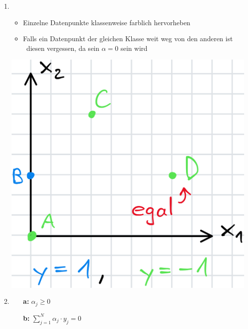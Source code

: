 \begin{enumerate}
    \item {} \\
    \begin{minipage}[c]{0.6\columnwidth}
        \begin{itemize}
            \item Einzelne Datenpunkte klassenweise farblich hervorheben
            \item Falls ein Datenpunkt der gleichen Klasse weit weg von den anderen ist\\
            \textrightarrow\ diesen vergessen, da sein $\alpha = 0$ sein wird
        \end{itemize}
    \end{minipage}\hfill
    \begin{minipage}[c]{0.33\columnwidth}
        \includegraphics[width=\columnwidth]{images/SVM_2.png}
    \end{minipage}
    \columnbreak
    \item {}
    \begin{itemize}
        \item [\textbf{a:}] $\boxed{\alpha_j\geq0}$
        \item [\textbf{b:}] $\boxed{\sum_{j=1}^N\alpha_j \cdot y_j=0}$\\

\end{itemize}
\end{enumerate}

